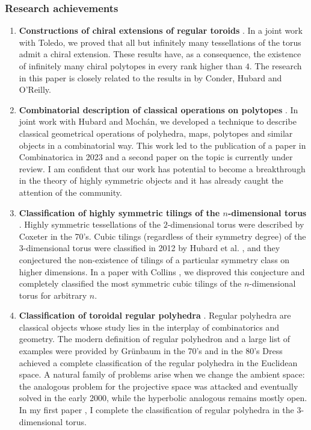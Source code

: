 \subsubsection*{Research achievements}
\begin{enumerate}
  \item \textbf{Constructions of chiral extensions of regular toroids} \cite{MonteToled_ChiralExtensionsRegular_preprint}. In a joint work with Toledo, we proved that all but infinitely many tessellations of the torus admit a chiral extension. 
  These results have, as a consequence, the existence of infinitely many chiral polytopes in every rank higher than $4$. 
  The research in this paper is closely related to the results in \cite{CondHubORe2024_ConstructionChiralPolytopes} by Conder, Hubard and O'Reilly.
  
	\item \textbf{Combinatorial description of classical operations on polytopes} \cite{HubaMocMon2023_VoltageOperationsManiplexes,HubaMocMon_SymmetriesVoltageOperations_preprint}. In joint work with Hubard and Mochán, we developed a technique to describe classical geometrical operations of polyhedra, maps, polytopes and similar objects in a combinatorial way. This work led to the publication of a paper in Combinatorica in 2023 \cite{HubaMocMon2023_VoltageOperationsManiplexes} and a second paper \cite{HubaMocMon_SymmetriesVoltageOperations_preprint} on the topic is currently under review.
	I am confident that our work has potential to become a breakthrough in the theory of highly symmetric objects and it has already caught the attention of the community.
  
	\item \textbf{Classification of highly symmetric tilings of the $n$-dimensional torus} \cite{ColliMonte2021_EquivelarToroidsFew}. Highly symmetric tessellations of the $2$-dimensional torus were described by Coxeter in the 70's. Cubic tilings (regardless of their symmetry degree) of the $3$-dimensional torus were classified in 2012 by Hubard et al. \cite{HubOrbPeWe2012_SymmetriesEquivelar4}, and they conjectured the non-existence of tilings of a particular symmetry class on higher dimensions. 
  In a paper with Collins \cite{ColliMonte2021_EquivelarToroidsFew}, we disproved this conjecture and completely classified the most symmetric cubic tilings of the $n$-dimensional torus for arbitrary $n$. 
	\item \textbf{Classification of toroidal regular polyhedra} \cite{Montero2018_RegularPolyhedra3}. Regular polyhedra are classical objects whose study lies in the interplay of combinatorics and geometry. 
  The modern definition of regular polyhedron and a large list of examples were provided by Grünbaum in the 70's and in the 80's Dress achieved a complete classification of the regular polyhedra in the Euclidean space. A natural family of problems arise when we change the ambient space: the analogous problem for the projective space was attacked and eventually solved in the early 2000, while the hyperbolic analogous remains mostly open. In my first paper \cite{Montero2018_RegularPolyhedra3}, I complete the classification of regular polyhedra in the $3$-dimensional torus.
  

\end{enumerate}
